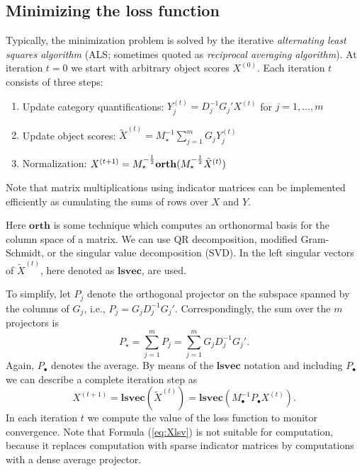 \documentclass[article]{jss1}
\begin{document}
\subsection{Minimizing the loss function}
Typically, the minimization problem is solved by the iterative \emph{alternating least squares algorithm} (ALS; sometimes quoted as \emph{reciprocal averaging algorithm}). At iteration $t=0$ we start with arbitrary object scores $X^{(0)}$. Each iteration $t$ consists of three steps:
\begin{enumerate}
\item Update category quantifications: $Y_j^{(t)}=D_j^{-1}G_j'X^{(t)}$ for $j=1,\ldots,m$
\item Update object scores: $\tilde X^{(t)}=M_\star^{-1}\sum_{j=1}^m G_j^{}Y_j^{(t)}$
\item Normalization: $X^{(t+1)}=M_\star^{-\frac12}{\bf orth}(M_\star^{-\frac12}\tilde X^{(t)})$
\end{enumerate}
Note that matrix multiplications using indicator matrices can be implemented efficiently as cumulating the sums of rows over $X$ and $Y$. 

Here $\mathbf{orth}$ is some technique which computes an orthonormal basis for the column space of a matrix. We can use QR decomposition, modified Gram-Schmidt, or the singular value decomposition (SVD). In  the left singular vectors of $\tilde X^{(t)}$, here denoted as $\mathbf{lsvec}$, are used. 

To simplify, let $P_j$ denote the orthogonal projector on the subspace spanned by the columns of $G_j$, i.e.,
$P_j^{}=G_j^{}D_j^{-1}G_j'$. Correspondingly, the sum over the $m$ projectors is 
\begin{equation}
P_\star=\sum_{j=1}^m P_j = \sum_{j=1}^m G_j^{}D_j^{-1}G_j'.
\end{equation}
Again, $P_\bullet$ denotes the average. By means of the $\mathbf{lsvec}$ notation and including $P_\bullet$ we can describe a complete iteration step as 
\begin{equation}
\label{eq:Xlsv}
X^{(t+1)}=\mathbf{lsvec}(\tilde X^{(t)})=\mathbf{lsvec}(M_\bullet^{-1}P_\bullet^{} X^{(t)}).
\end{equation}
In each iteration $t$ we compute the value of the loss function to monitor convergence. Note that Formula (\ref{eq:Xlsv}) is not suitable for computation, because it replaces computation with sparse indicator matrices by computations with a dense average projector. 
\end{document}
